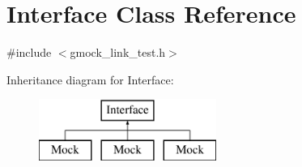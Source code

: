 \hypertarget{class_interface}{}\section{Interface Class Reference}
\label{class_interface}


{\ttfamily \#include $<$gmock\+\_\+link\+\_\+test.\+h$>$}

Inheritance diagram for Interface\+:\begin{figure}[H]
\begin{center}
\leavevmode
\includegraphics[height=2.000000cm]{de/d95/class_interface}
\end{center}
\end{figure}
